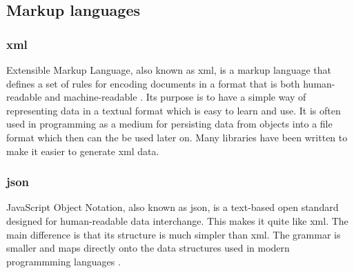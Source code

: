 \subsection{Markup languages}

\subsubsection{\gls{xml}}
Extensible Markup Language, also known as \gls{xml}, is a markup language that defines a set of rules for encoding documents in a format that is both human-readable and machine-readable \cite{bib:xml}. Its purpose is to have a simple way of representing data in a textual format which is easy to learn and use. It is often used in programming as a medium for persisting data from objects into a file format which then can the be used later on. Many libraries have been written to make it easier to generate \gls{xml} data.

\subsubsection{\gls{json}}
JavaScript Object Notation, also known as \gls{json}, is a text-based open standard designed for human-readable data interchange. This makes it quite like \gls{xml}. The main difference is that its structure is much simpler than \gls{xml}. The grammar is smaller and maps directly onto the data structures used in modern programmming languages \cite{bib:json}.


